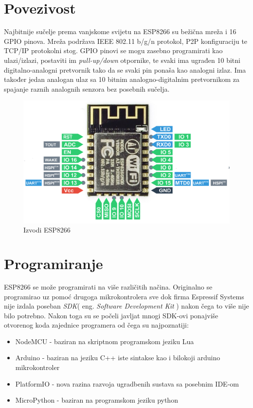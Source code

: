 \documentclass[times, utf8, zavrsni]{fer}
\begin{document}
\section{Povezivost}
Najbitnije sučelje prema vanjskome svijetu na ESP8266 su bežična mreža i 16 GPIO pinova.
Mreža podržava IEEE 802.11 b/g/n protokol, P2P konfiguraciju te TCP/IP protokolni stog.
GPIO pinovi se mogu zasebno programirati kao ulazi/izlazi, postaviti im \textit{pull-up/down} otpornike, te svaki ima ugrađen 10 bitni digitalno-analogni pretvornik tako da se svaki pin ponaša kao analogni izlaz.
Ima također jedan analogan ulaz sa 10 bitnim analogno-digitalnim pretvornikom za spajanje raznih analognih senzora bez posebnih sučelja.
\begin{figure}[h]
    \centering
    \includegraphics[scale=0.8]{ESP-Pin-Out.png}
    \caption{Izvodi ESP8266}
\end{figure}

\section{Programiranje} 
ESP8266 se može programirati na više različitih načina.
Originalno se programirao uz pomoć drugoga mikrokontrolera sve dok firma Espressif Systems nije izdala poseban \textit{SDK}(  eng. \textit{Software Development Kit} ) nakon čega to više nije bilo potrebno.
Nakon toga su se počeli javljat mnogi SDK-ovi ponajviše otvorenog koda zajednice programera od čega su najpoznatiji:
    \begin{itemize}
        \item NodeMCU - baziran na skriptnom programskom jeziku Lua
        \item Arduino - baziran na jeziku C++ iste sintakse kao i bilokoji arduino mikrokontroler
        \item PlatformIO - nova razina razvoja ugradbenih sustava sa posebnim IDE-om
        \item MicroPython - baziran na programskom jeziku python
    \end{itemize}
\end{document}
